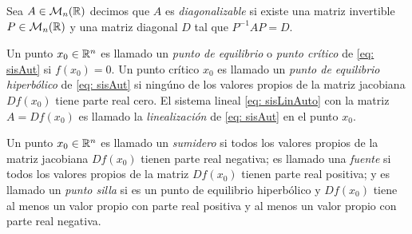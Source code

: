     Sea $A \in \mathcal{M}_{n}({\mathbb{R}})$ decimos que $A$ es \textit{diagonalizable} si existe una matriz invertible $P \in \mathcal{M}_{n}({\mathbb{R}})$ y una matriz diagonal $D$ tal que $P^{-1}AP = D$.
   
    Un punto $x_{0} \in {\mathbb{R}}^{n}$ es llamado un \textit{punto de equilibrio} o \textit{punto crítico} de \eqref{eq: sisAut} si $f(x_{0})=0$. Un punto crítico $x_{0}$ es llamado un \textit{punto de equilibrio hiperbólico} de \eqref{eq: sisAut} si ningúno de los valores propios de la matriz jacobiana $Df(x_{0})$ tiene parte real cero. El sistema lineal \eqref{eq: sisLinAuto} con la matriz $A = Df(x_{0})$ es llamado la \textit{linealización} de \eqref{eq: sisAut} en el punto $x_{0}$.
   
    Un punto $x_{0} \in {\mathbb{R}}^{n}$ es llamado un \textit{sumidero} si todos los valores propios de la matriz jacobiana $Df(x_{0})$ tienen parte real negativa; es llamado una \textit{fuente} si todos los valores propios de la matriz $Df(x_{0})$ tienen parte real positiva; y es llamado un \textit{punto silla} si es un punto de equilibrio hiperbólico y $Df(x_{0})$ tiene al menos un valor propio con parte real positiva y al menos un valor propio con parte real negativa.
   
   